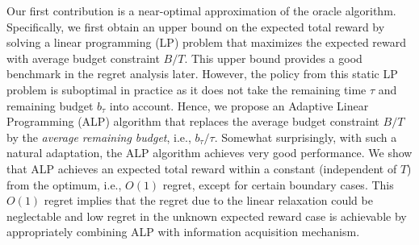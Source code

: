 {%

Our first contribution is a near-optimal approximation of the oracle algorithm.  Specifically, we first obtain an upper bound on the expected total reward by solving a linear programming (LP) problem that maximizes the expected reward with average budget constraint $B/T$.
This upper bound provides a good benchmark in the regret analysis later. However,
the policy  from this static LP problem is suboptimal in practice as it  does not take the remaining time $\tau$ and remaining budget $b_{\tau}$ into account. Hence, we propose an Adaptive Linear Programming (ALP) algorithm that replaces the average budget constraint $B/T$ by the \emph{average remaining budget}, i.e., $b_{\tau}/\tau$.
Somewhat surprisingly, with such a natural adaptation, the ALP algorithm achieves very good performance. We show that ALP achieves an expected total reward within a constant (independent of $T$) from the optimum, i.e., $O(1)$ regret, except for certain boundary cases. This $O(1)$ regret implies that the regret due to the linear relaxation could be neglectable and low regret in the unknown expected reward case is achievable by appropriately combining ALP with information acquisition mechanism.

}
